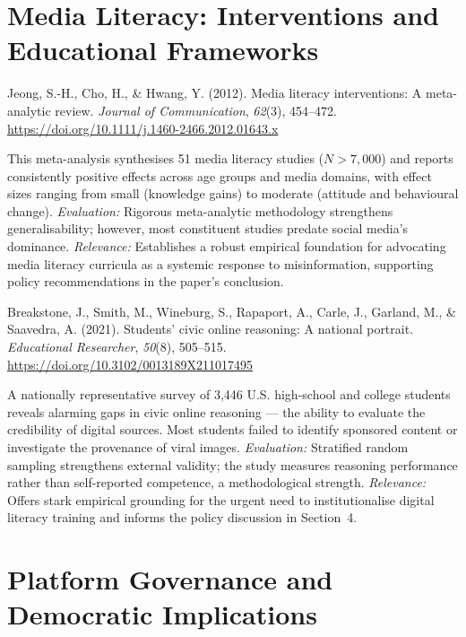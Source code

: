 \documentclass[11pt, letterpaper]{article}
\newcommand{\bibentry}[2]{%
  \begin{list}{}{%
    \setlength{\leftmargin}{0.5in}%
    \setlength{\itemindent}{-0.5in}%
    \setlength{\topsep}{6pt}%
    \setlength{\itemsep}{0pt}%
    \setlength{\parsep}{0pt}%
  }%
  \item \textcolor{neutral}{#1}%
  \end{list}%
  \vspace{4pt}%
  \begin{list}{}{%
    \setlength{\leftmargin}{0.5in}%
    \setlength{\topsep}{0pt}%
    \setlength{\itemsep}{0pt}%
    \setlength{\parsep}{0pt}%
  }%
  \item \textcolor{neutral}{#2}%
  \end{list}%
  \vspace{10pt}%
}
\begin{document}
\section{Media Literacy: Interventions and Educational Frameworks}

\bibentry
  {Jeong, S.-H., Cho, H., \& Hwang, Y. (2012). Media literacy interventions: A meta-analytic
   review. \textit{Journal of Communication}, \textit{62}(3), 454–472.
   \href{https://doi.org/10.1111/j.1460-2466.2012.01643.x}{https://doi.org/10.1111/j.1460-2466.2012.01643.x}}
  {This meta-analysis synthesises 51 media literacy studies ($N > 7{,}000$) and reports
   consistently positive effects across age groups and media domains, with effect sizes ranging from
   small (knowledge gains) to moderate (attitude and behavioural change). \textit{Evaluation:}
   Rigorous meta-analytic methodology strengthens generalisability; however, most constituent
   studies predate social media's dominance. \textit{Relevance:} Establishes a robust empirical
   foundation for advocating media literacy curricula as a systemic response to misinformation,
   supporting policy recommendations in the paper's conclusion.}

\bibentry
  {Breakstone, J., Smith, M., Wineburg, S., Rapaport, A., Carle, J., Garland, M., \& Saavedra, A.
   (2021). Students' civic online reasoning: A national portrait.
   \textit{Educational Researcher}, \textit{50}(8), 505–515.
   \href{https://doi.org/10.3102/0013189X211017495}{https://doi.org/10.3102/0013189X211017495}}
  {A nationally representative survey of 3,446 U.S. high-school and college students reveals
   alarming gaps in civic online reasoning — the ability to evaluate the credibility of digital
   sources. Most students failed to identify sponsored content or investigate the provenance of
   viral images. \textit{Evaluation:} Stratified random sampling strengthens external validity;
   the study measures reasoning performance rather than self-reported competence, a methodological
   strength. \textit{Relevance:} Offers stark empirical grounding for the urgent need to
   institutionalise digital literacy training and informs the policy discussion in Section~4.}

\section{Platform Governance and Democratic Implications}
\end{document}
